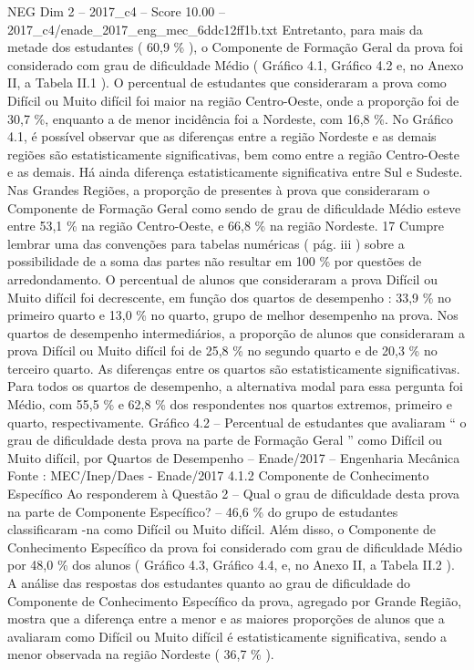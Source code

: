 \begin{textsample}{NEG Dim 2 – 2017\_c4 – Score 10.00 – 2017\_c4/enade\_2017\_eng\_mec\_6ddc12ff1b.txt}
Entretanto, para mais da metade dos estudantes ( 60,9 \% ), o Componente de Formação Geral da prova foi considerado com grau de dificuldade Médio ( Gráfico 4.1, Gráfico 4.2 e, no Anexo II, a Tabela II.1 ).
O percentual de estudantes que consideraram a prova como Difícil ou Muito difícil foi maior na região Centro-Oeste, onde a proporção foi de 30,7 \%, enquanto a de menor incidência foi a Nordeste, com 16,8 \%.
No Gráfico 4.1, é possível observar que as diferenças entre a região Nordeste e as demais regiões são estatisticamente significativas, bem como entre a região Centro-Oeste e as demais.
Há ainda diferença estatisticamente significativa entre Sul e Sudeste.
Nas Grandes Regiões, a proporção de presentes à prova que consideraram o Componente de Formação Geral como sendo de grau de dificuldade Médio esteve entre 53,1 \% na região Centro-Oeste, e 66,8 \% na região Nordeste. 17 Cumpre lembrar uma das convenções para tabelas numéricas ( pág. iii ) sobre a possibilidade de a soma das partes não resultar em 100 \% por questões de arredondamento.
O percentual de alunos que consideraram a prova Difícil ou Muito difícil foi decrescente, em função dos quartos de desempenho : 33,9 \% no primeiro quarto e 13,0 \% no quarto, grupo de melhor desempenho na prova.
Nos quartos de desempenho intermediários, a proporção de alunos que consideraram a prova Difícil ou Muito difícil foi de 25,8 \% no segundo quarto e de 20,3 \% no terceiro quarto.
As diferenças entre os quartos são estatisticamente significativas.
Para todos os quartos de desempenho, a alternativa modal para essa pergunta foi Médio, com 55,5 \% e 62,8 \% dos respondentes nos quartos extremos, primeiro e quarto, respectivamente.
Gráfico 4.2 – Percentual de estudantes que avaliaram “ o grau de dificuldade desta prova na parte de Formação Geral ” como Difícil ou Muito difícil, por Quartos de Desempenho – Enade/2017 – Engenharia Mecânica Fonte : MEC/Inep/Daes - Enade/2017 4.1.2 Componente de Conhecimento Específico Ao responderem à Questão 2 – Qual o grau de dificuldade desta prova na parte de Componente Específico? – 46,6 \% do grupo de estudantes classificaram -na como Difícil ou Muito difícil.
Além disso, o Componente de Conhecimento Específico da prova foi considerado com grau de dificuldade Médio por 48,0 \% dos alunos ( Gráfico 4.3, Gráfico 4.4, e, no Anexo II, a Tabela II.2 ).
A análise das respostas dos estudantes quanto ao grau de dificuldade do Componente de Conhecimento Específico da prova, agregado por Grande Região, mostra que a diferença entre a menor e as maiores proporções de alunos que a avaliaram como Difícil ou Muito difícil é estatisticamente significativa, sendo a menor observada na região Nordeste ( 36,7 \% ).

\end{textsample}
